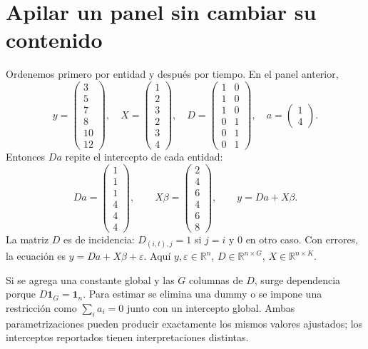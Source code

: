 \documentclass[11pt,a4paper]{article}
\newcommand{\R}{\mathbb R}
\newcommand{\ones}{\mathbf 1}
\theoremstyle{definition}
\newcommand{\eps}{\varepsilon}
\begin{document}
\section{Apilar un panel sin cambiar su contenido}
Ordenemos primero por entidad y después por tiempo. En el panel anterior,
\[
y=\begin{pmatrix}3\\5\\7\\8\\10\\12\end{pmatrix},\quad
X=\begin{pmatrix}1\\2\\3\\2\\3\\4\end{pmatrix},\quad
D=\begin{pmatrix}
1&0\\1&0\\1&0\\0&1\\0&1\\0&1
\end{pmatrix},\quad
a=\begin{pmatrix}1\\4\end{pmatrix}.
\]
Entonces $Da$ repite el intercepto de cada entidad:
\[
Da=\begin{pmatrix}1\\1\\1\\4\\4\\4\end{pmatrix},\qquad
X\beta=\begin{pmatrix}2\\4\\6\\4\\6\\8\end{pmatrix},\qquad
y=Da+X\beta.
\]
La matriz $D$ es de incidencia: $D_{(i,t),j}=1$ si $j=i$ y $0$ en otro caso. Con errores, la ecuación es $y=Da+X\beta+\eps$. Aquí $y,\eps\in\R^n$, $D\in\R^{n\times G}$, $X\in\R^{n\times K}$.

Si se agrega una constante global y las $G$ columnas de $D$, surge dependencia porque $D\ones_G=\ones_n$. Para estimar se elimina una dummy o se impone una restricción como $\sum_i a_i=0$ junto con un intercepto global. Ambas parametrizaciones pueden producir exactamente los mismos valores ajustados; los interceptos reportados tienen interpretaciones distintas.
\end{document}
